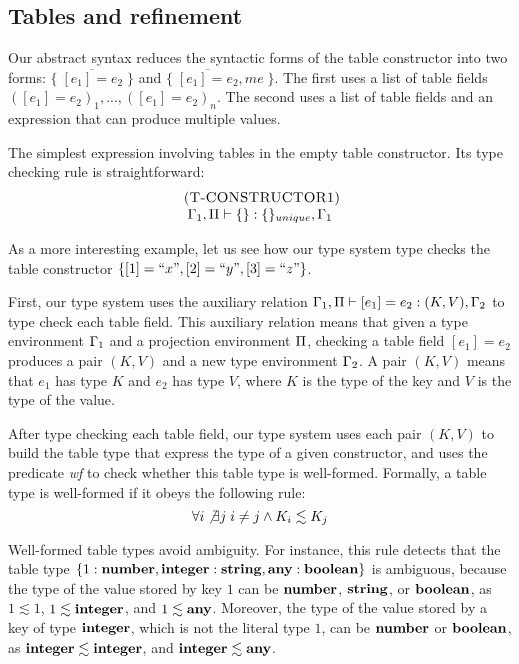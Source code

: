 \subsection{Tables and refinement}
\label{sec:refinement}

Our abstract syntax reduces the syntactic forms of the table constructor
into two forms: $\{\;\overline{[e_{1}] = e_{2}}\;\}$ and
$\{\;\overline{[e_{1}] = e_{2}},me\;\}$.
The first uses a list of table fields $([e_{1}] = e_{2})_{1}, ..., ([e_{1}] = e_{2})_{n}$.
The second uses a list of table fields and an expression that can
produce multiple values.

The simplest expression involving tables in the empty table constructor.
Its type checking rule is straightforward:
\[
\begin{array}{c}
\; (\textsc{T-CONSTRUCTOR1})\\
\Gamma_{1}, \Pi \vdash \{\}:\{\}_{unique}, \Gamma_{1}
\end{array}
\]

As a more interesting example, let us see how our type system type checks
the table constructor $\{ [1] = ``x", [2] = ``y", [3] = ``z" \}$.

First, our type system uses the auxiliary relation
$\Gamma_{1}, \Pi \vdash [e_{1}] = e_{2} : (K,V), \Gamma_{2}$ to type check each
table field.
This auxiliary relation means that given a type environment $\Gamma_{1}$
and a projection environment $\Pi$, checking a table field $[e_{1}] = e_{2}$
produces a pair $(K,V)$ and a new type environment $\Gamma_{2}$.
A pair $(K,V)$ means that $e_{1}$ has type $K$ and $e_{2}$ has type $V$,
where $K$ is the type of the key and $V$ is the type of the value.

After type checking each table field, our type system uses each pair $(K,V)$
to build the table type that express the type of a given constructor, and
uses the predicate \emph{wf} to check whether this table type is well-formed.
Formally, a table type is well-formed if it obeys the following rule:
\[
\forall i \not\exists j \; i \not= j \wedge K_{i} \lesssim K_{j}
\]

Well-formed table types avoid ambiguity.
For instance, this rule detects that the table type
$\{1:\mathbf{number}, \mathbf{integer}:\mathbf{string}, \mathbf{any}:\mathbf{boolean}\}$ is ambiguous,
because the type of the value stored by key $1$ can be
$\mathbf{number}$, $\mathbf{string}$, or $\mathbf{boolean}$, as $1 \lesssim 1$,
$1 \lesssim \mathbf{integer}$, and $1 \lesssim \mathbf{any}$.
Moreover, the type of the value stored by a key of type $\mathbf{integer}$,
which is not the literal type $1$, can be $\mathbf{number}$ or $\mathbf{boolean}$,
as $\mathbf{integer} \lesssim \mathbf{integer}$, and $\mathbf{integer} \lesssim \mathbf{any}$.


